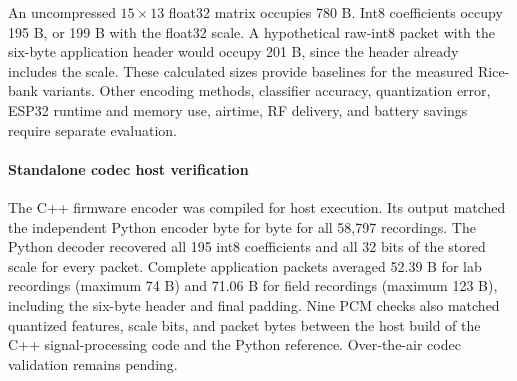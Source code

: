 An uncompressed $15\times13$ float32 matrix occupies 780 B. Int8 coefficients occupy 195 B, or 199 B with the float32 scale. A hypothetical raw-int8 packet with the six-byte application header would occupy 201 B, since the header already includes the scale. These calculated sizes provide baselines for the measured Rice-bank variants. Other encoding methods, classifier accuracy, quantization error, ESP32 runtime and memory use, airtime, RF delivery, and battery savings require separate evaluation.

\paragraph{Standalone codec host verification}
The C++ firmware encoder was compiled for host execution. Its output matched the independent Python encoder byte for byte for all 58,797 recordings. The Python decoder recovered all 195 int8 coefficients and all 32 bits of the stored scale for every packet. Complete application packets averaged 52.39 B for lab recordings (maximum 74 B) and 71.06 B for field recordings (maximum 123 B), including the six-byte header and final padding. Nine PCM checks also matched quantized features, scale bits, and packet bytes between the host build of the C++ signal-processing code and the Python reference. Over-the-air codec validation remains pending.
\endgroup
\FloatBarrier
